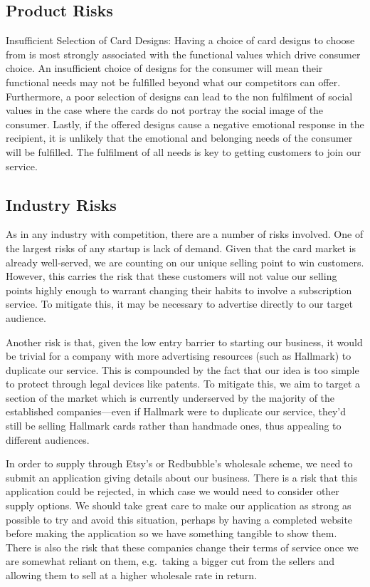 \documentclass[10pt,a4paper]{article}
\begin{document}
\subsection*{Product Risks}
Insufficient Selection of Card Designs: Having a choice of card designs to choose from is most strongly associated with the functional values which drive consumer choice. An insufficient choice of designs for the consumer will mean their functional needs may not be fulfilled beyond what our competitors can offer. Furthermore, a poor selection of designs can lead to the non fulfilment of social values in the case where the cards do not portray the social image of the consumer. Lastly, if the offered designs cause a negative emotional response in the recipient, it is unlikely that the emotional and belonging needs of the consumer will be fulfilled. The fulfilment of all needs is key to getting customers to join our service.

\subsection*{Industry Risks}
As in any industry with competition, there are a number of risks involved. One of the largest risks of any startup is lack of demand. Given that the card market is already well-served, we are counting on our unique selling point to win customers. However, this carries the risk that these customers will not value our selling points highly enough to warrant changing their habits to involve a subscription service. To mitigate this, it may be necessary to advertise directly to our target audience.

Another risk is that, given the low entry barrier to starting our business, it would be trivial for a company with more advertising resources (such as Hallmark) to duplicate our service. This is compounded by the fact that our idea is too simple to protect through legal devices like patents. To mitigate this, we aim to target a section of the market which is currently underserved by the majority of the established companies---even if Hallmark were to duplicate our service, they'd still be selling Hallmark cards rather than handmade ones, thus appealing to different audiences.

In order to supply through Etsy's or Redbubble's wholesale scheme, we need to submit an application giving details about our business. There is a risk that this application could be rejected, in which case we would need to consider other supply options. We should take great care to make our application as strong as possible to try and avoid this situation, perhaps by having a completed website before making the application so we have something tangible to show them. There is also the risk that these companies change their terms of service once we are somewhat reliant on them, e.g.\ taking a bigger cut from the sellers and allowing them to sell at a higher wholesale rate in return.
\end{document}
